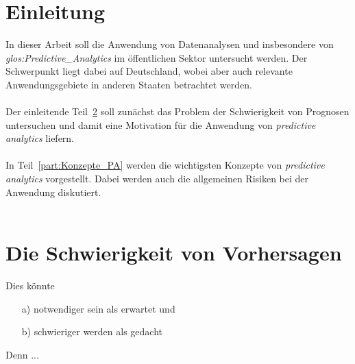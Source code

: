 \chapter{Einleitung}

In dieser Arbeit soll die Anwendung von Datenanalysen und insbesondere
von \emph{\gls{glos:Predictive_Analytics}} im öffentlichen Sektor untersucht
werden.
Der Schwerpunkt liegt dabei auf Deutschland, wobei aber auch relevante
Anwendungsgebiete in anderen Staaten betrachtet werden. \\ \\
Der einleitende Teil~\ref{part:Schw_Vorhersagen} soll zunächst das Problem der
Schwierigkeit von
Prognosen untersuchen und damit eine Motivation für die Anwendung von 
\emph{predictive analytics} liefern. \\ \\
In Teil~\ref{part:Konzepte_PA} werden die wichtigsten Konzepte von
\emph{predictive analytics} vorgestellt. Dabei werden auch die allgemeinen
Risiken bei der Anwendung diskutiert. \\ \\

\chapter{Die Schwierigkeit von Vorhersagen}
\label{part:Schw_Vorhersagen}

Dies könnte
\begin{itemize}
\item[a)] notwendiger sein als erwartet und
\item[b)] schwieriger werden als gedacht
\end{itemize}
Denn ...

